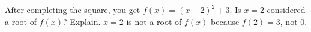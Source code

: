 {After completing the square, you get $f(x)=(x-2)^2+3$. Is $x=2$ considered a root of $f(x)$? Explain.}
{$x=2$ is not a root of $f(x)$ because $f(2)=3$, not $0$.}
